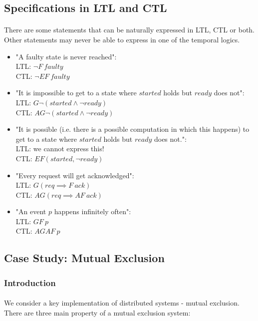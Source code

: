 \documentclass{article}
\theoremstyle{plain}
\theoremstyle{definition}
\begin{document}
\begin{multicols}{2}
\subsection{Specifications in LTL and CTL}

\paragraph{} There are some statements that can be naturally expressed in LTL, CTL or both. Other statements may never be able to express in one of the temporal logics.

\begin{itemize}
\item "A faulty state is never reached":\\ LTL: $\lnot F\ faulty$\\ CTL: $\lnot EF\ faulty$
\item "It is impossible to get to a state where $started$ holds but $ready$ does not":\\ LTL: $G\lnot(started \land \lnot ready)$\\ CTL: $AG\lnot(started \land \lnot ready)$
\item "It is possible (i.e. there is a possible computation in which this happens) to get to a state where $started$ holds but $ready$ does not.":\\ LTL: we cannot express this!\\CTL: $EF(started, \lnot ready)$
\item "Every request will get acknowledged":\\ LTL: $G(req \implies F\ ack)$\\ CTL: $AG(req \implies AF\ ack)$
\item "An event $p$ happens infinitely often":\\ LTL: $GF\ p$\\ CTL: $AGAF\ p$
\end{itemize}

\subsection{Case Study: Mutual Exclusion}

\subsubsection{Introduction}

\paragraph{} We consider a key implementation of distributed systems - mutual exclusion. There are three main property of a mutual exclusion system:


\end{multicols}
\end{document}
